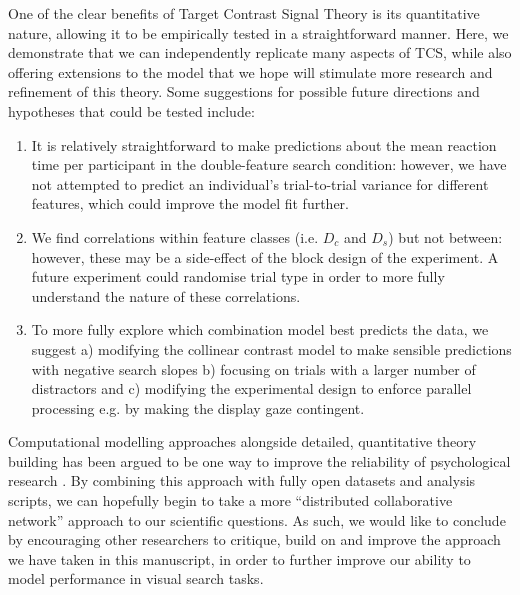 \documentclass[preprint,12pt,authoryear]{elsarticle}
\begin{document}
One of the clear benefits of Target Contrast Signal Theory \citep{lleras2020target} is its quantitative nature, allowing it to be empirically tested in a straightforward manner. Here, we demonstrate that we can independently replicate many aspects of TCS, while also offering extensions to the model that we hope will stimulate more research and refinement of this theory. Some suggestions for possible future directions and hypotheses that could be tested include:

\begin{enumerate}
\item It is relatively straightforward to make predictions about the mean reaction time per participant in the double-feature search condition: however, we have not  attempted to predict an individual's trial-to-trial variance for different features, which could improve the model fit further.
\\
\item We find correlations within feature classes (i.e. $D_c$ and $D_s$) but not between: however, these may be a side-effect of the block design of the experiment. A future experiment could randomise trial type in order to more fully understand the nature of these correlations.
\\
\item To more fully explore which combination model best predicts the data, we suggest a) modifying the collinear contrast model to make sensible predictions with negative search slopes b) focusing on trials with a larger number of distractors and c) modifying the experimental design to enforce parallel processing e.g. by making the display gaze contingent.
\end{enumerate}

Computational modelling approaches alongside detailed, quantitative theory building has been argued to be one way to improve the reliability of psychological research \citep{oberauer2019addressing, guest2021computational}. By combining this approach with fully open datasets and analysis scripts, we can hopefully begin to take a more ``distributed collaborative network'' approach \citep{moshontz2018psychological} to our scientific questions. As such, we would like to conclude by encouraging other researchers to critique, build on and improve the approach we have taken in this manuscript, in order to further improve our ability to model performance in visual search tasks. 

%
\end{document}
